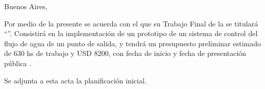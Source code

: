 \documentclass[
11pt, %
codirector, %
]{charter}
\begin{document}
\begin{flushright}
Buenos Aires, \fechaInicioName
\end{flushright}

\vspace{2cm}

Por medio de la presente se acuerda con el \authorname\hspace{1px} que su Trabajo Final de la \degreename\hspace{1px} se titulará ``\ttitle''. Consistirá en la implementación de un prototipo de un sistema de control del flujo de agua de un punto de salida, y tendrá un presupuesto preliminar estimado de 630 hs de trabajo y USD 8200, con fecha de inicio \fechaInicioName\hspace{1px} y fecha de presentación pública \fechaFinalName.

Se adjunta a esta acta la planificación inicial.

\vfill
\end{document}
